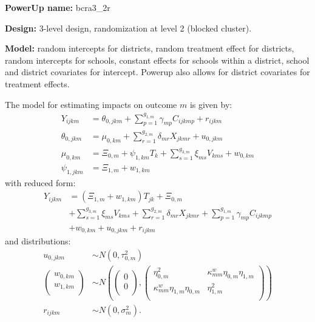 \documentclass[12pt]{article}
\begin{document}
\textbf{PowerUp name:} bcra3\_2r

\textbf{Design:} 3-level design, randomization at level 2 (blocked cluster).

\textbf{Model:} random intercepts for districts, random treatment effect for districts, random intercepts for schools, constant effects for schools within a district, school and district covariates for intercept. Powerup also allows for district covariates for treatment effects.

The model for estimating impacts on outcome $m$ is given by:
\begin{align}
Y_{ijkm} &=  \theta_{0,jkm} + \sum_{p=1}^{g_{1,m}} \gamma_{mp} C_{ijkmp} + r_{ijkm}\\
\nonumber \theta_{0,jkm} &= \mu_{0,km} + \sum_{r=1}^{g_{2,m}} \delta_{mr} X_{jkmr} + u_{0,jkm}\\
\nonumber \mu_{0,km}  &= \Xi_{0,m} + \psi_{1,km} T_{k} + \sum_{s=1}^{g_{3,m}} \xi_{ms} V_{kms} + w_{0,km} \\
\nonumber \psi_{1,jkm} &= \Xi_{1,m} + w_{1,km}
\end{align}
with reduced form:
\begin{align}
Y_{ijkm} &= \left(\Xi_{1,m} + w_{1,km}\right) T_{jk} + \Xi_{0,m}\\
\nonumber & + \sum_{s=1}^{g_{3,m}} \xi_{ms} V_{kms} + \sum_{r=1}^{g_{2,m}} \delta_{mr} X_{jkmr} + \sum_{p=1}^{g_{1,m}} \gamma_{mp} C_{ijkmp}\\
\nonumber &+ w_{0,km} + u_{0,jkm} + r_{ijkm}
\end{align}
and distributions:
\begin{align}
u_{0,jkm} &\sim N\left(0, \tau^2_{0,m}\right)\\
\nonumber \begin{pmatrix} w_{0, km} \\ w_{1,km}\\ \end{pmatrix} &\sim
N\left(\begin{pmatrix} 0 \\ 0\\ \end{pmatrix}, \begin{pmatrix} \eta^2_{0,m} & \kappa^w_{mm} \eta_{0,m} \eta_{1,m} \\ \kappa^w_{mm} \eta_{1,m} \eta_{0,m} & \eta^2_{1,m} \\ \end{pmatrix}\right) \\
\nonumber r_{ijkm} &\sim N\left(0, \sigma^2_m\right).
\end{align}
\end{document}
